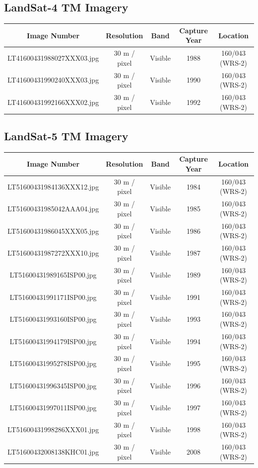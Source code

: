 \subsection{LandSat-4 TM Imagery}

\begin{table} [h!]
	\centering
	\begin{tabular}{| c | c | c | c | c |}
	\hline
	\textbf{Image Number} & \textbf{Resolution} & \textbf{Band} & \textbf{Capture Year} & \textbf{Location} \\ \hline
	LT41600431988027XXX03.jpg & 30 m / pixel& Visible & 1988 & 160/043 (WRS-2) \\ \hline 
	LT41600431990240XXX03.jpg & 30 m / pixel& Visible & 1990 & 160/043 (WRS-2) \\ \hline 
	LT41600431992166XXX02.jpg & 30 m / pixel& Visible & 1992 & 160/043 (WRS-2) \\ \hline 
	\end{tabular}
\end{table}

\subsection{LandSat-5 TM Imagery}
\begin{table}[h!]
	\centering
	\begin{tabular}{| c | c | c | c | c |}
	\hline
	\textbf{Image Number} & \textbf{Resolution} & \textbf{Band} & \textbf{Capture Year} & \textbf{Location} \\ \hline
	LT51600431984136XXX12.jpg & 30 m / pixel& Visible & 1984 & 160/043 (WRS-2) \\ \hline 
	LT51600431985042AAA04.jpg & 30 m / pixel& Visible & 1985 & 160/043 (WRS-2) \\ \hline 
	LT51600431986045XXX05.jpg & 30 m / pixel& Visible & 1986 & 160/043 (WRS-2) \\ \hline 
	LT51600431987272XXX10.jpg & 30 m / pixel& Visible & 1987 & 160/043 (WRS-2) \\ \hline 
	LT51600431989165ISP00.jpg & 30 m / pixel& Visible & 1989 & 160/043 (WRS-2) \\ \hline 
	LT51600431991171ISP00.jpg & 30 m / pixel& Visible & 1991 & 160/043 (WRS-2) \\ \hline 
	LT51600431993160ISP00.jpg & 30 m / pixel& Visible & 1993 & 160/043 (WRS-2) \\ \hline 
	LT51600431994179ISP00.jpg & 30 m / pixel& Visible & 1994 & 160/043 (WRS-2) \\ \hline 
	LT51600431995278ISP00.jpg & 30 m / pixel& Visible & 1995 & 160/043 (WRS-2) \\ \hline 
	LT51600431996345ISP00.jpg & 30 m / pixel& Visible & 1996 & 160/043 (WRS-2) \\ \hline 
	LT51600431997011ISP00.jpg & 30 m / pixel& Visible & 1997 & 160/043 (WRS-2) \\ \hline 
	LT51600431998286XXX01.jpg & 30 m / pixel& Visible & 1998 & 160/043 (WRS-2) \\ \hline 
	LT51600432008138KHC01.jpg & 30 m / pixel& Visible & 2008 & 160/043 (WRS-2) \\ \hline 
	\end{tabular}
\end{table}

